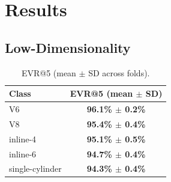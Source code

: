 \documentclass[11pt]{article}
\begin{document}
\section{Results}

\subsection{Low-Dimensionality}

\begin{table}[!htbp]
\caption{EVR@5 (mean $\pm$ SD across folds).}
\label{tab:evr}
\centering
\begin{tabular}{lc}
\toprule
\textbf{Class} & \textbf{EVR@5 (mean $\pm$ SD)} \\
\midrule
V6               & \textbf{96.1\% $\pm$ 0.2\%} \\
V8               & \textbf{95.4\% $\pm$ 0.4\%} \\
inline-4         & \textbf{95.1\% $\pm$ 0.5\%} \\
inline-6         & \textbf{94.7\% $\pm$ 0.4\%} \\
single-cylinder  & \textbf{94.3\% $\pm$ 0.4\%} \\
\bottomrule
\end{tabular}
\end{table}
\end{document}
